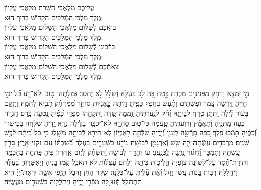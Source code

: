 \documentclass[twoside, openany, parskip=half, 11pt]{book}
\begin{document}
\birkashabonim

\medskip



עֲלֵיכֶם מַלְאֲכֵי הַשָּׁרֵת מַלְאֲכֵי עֶלְיוֹן\\ מֶֽלֶךְ מַלְכֵי הַמְּֿלָכִים הַקָּדוֹשׁ בָּרוּךְ הוּא: \\
בּוֹאֲכֶם לְֿשָׁלוֹם מַלְאֲכֵי הַשָּׁלוֹם מַלְאֲכֵי עֶלְיוֹן\\ מֶֽלֶךְ מַלְכֵי הַמְּֿלָכִים הַקָּדוֹשׁ בָּרוּךְ הוּא:\\
בָּרְֿכֽוּנִי לְֿשָׁלוֹם מַלְאֲכֵי הַשָּׁלוֹם מַלְאֲכֵי עֶלְיוֹן \\ מֶֽלֶךְ מַלְכֵי הַמְּֿלָכִים הַקָּדוֹשׁ בָּרוּךְ הוּא:\\
צֵאתְֿכֶם לְֿשָׁלוֹם מַלְאֲכֵי הַשָּׁלוֹם מַלְאֲכֵי עֶלְיוֹן\\ מֶֽלֶךְ מַלְכֵי הַמְּֿלָכִים הַקָּדוֹשׁ בָּרוּךְ הוּא:

\vfill
\clearpage


מִ֣י יִמְצָ֑א וְֿרָחֹ֖ק מִפְּֿנִינִ֣ים מִכְרָֽהּ׃ \hfill \break
בָּ֣טַח בָּ֭הּ לֵ֥ב בַּעְלָּ֑הּ וְֿ֝שָׁלָ֗ל לֹ֣א יֶחְסָר׃ \hfill \break
גְּֿמָלַ֣תְהוּ ט֣וֹב וְֿלֹא־רָ֑ע כֹּ֝֗ל יְֿמֵ֣י חַיֶּֽיהָ׃ \hfill \break
דָּֽ֭רְֿשָׁה צֶ֥מֶר וּפִשְׁתִּ֑ים וַ֝תַּ֗עַשׂ בְּֿחֵ֣פֶץ כַּפֶּֽיהָ׃ \hfill \break
הָֽ֭יְֿתָה כׇׇׇׇׇׇׇׇָּֽאֳנִיּ֣וֹת סוֹחֵ֑ר מִ֝מֶּרְחָ֗ק תָּ֘בִ֥יא לַחְמָֽהּ׃ \hfill \break
וַתָּ֤קָם בְּֿע֬וֹד לַ֗יְֿלָה וַתִּתֵּ֣ן טֶ֣רֶף לְֿבֵיתָ֑הּ וְֿ֝חֹ֗ק לְֿנַֽעֲרֹתֶֽיהָ׃ \hfill \break
זָֽמֲמָ֣ה שָׂ֭דֶה וַתִּקָּחֵ֑הוּ מִפְּֿרִ֥י כַ֝פֶּ֗יהָ נָ֣טְֿעָה כָּֽרֶם׃ \hfill \break
חָֽגְֿרָ֣ה בְֿע֣וֹז מָתְֿנֶ֑יהָ וַ֝תְּֿאַמֵּ֗ץ זְֿרוֹֽעֹתֶֽיהָ׃ \hfill \break
טָֽ֣֭עֲמָה כִּֽי־ט֣וֹב סַחְרָ֑הּ לֹֽא־יִכְבֶּ֖ה בַלַּ֣יְֿלָה נֵרָֽהּ׃ \hfill \break
יָ֭דֶיהָ שִׁלְּֿחָ֣ה בַכִּישׁ֑וֹר וְֿ֝כַפֶּ֗יהָ תָּ֣מְֿכוּ פָֽלֶךְ׃ \hfill \break
כַּ֭פָּהּ פָּֽרְֿשָׂ֣ה לֶֽעָנִ֑י וְֿ֝יָדֶ֗יהָ שִׁלְּֿחָ֥ה לָֽאֶבְיֽוֹן׃ \hfill \break
לֹֽא־תִירָ֣א לְֿבֵיתָ֣הּ מִשָּׁ֑לֶג כִּ֥י כׇל־בֵּ֝יתָ֗הּ לָ֘בֻ֥שׁ שָׁנִֽים׃ \hfill \break
מַרְבַדִּ֥ים עָֽשְֿׂתָה־לָּ֑הּ שֵׁ֖שׁ וְֿאַרְגָּמָ֣ן לְֿבוּשָֽׁהּ׃ \hfill \break
נוֹדָ֣ע בַּשְּֿׁעָרִ֣ים בַּעְלָּ֑הּ בְּֿ֝שִׁבְתּ֗וֹ עִם־זִקְנֵי־אָֽרֶץ׃ \hfill \break
סָדִ֣ין עָֽ֭שְֿׂתָה וַתִּמְכֹּ֑ר וַֽ֝חֲג֗וֹר נָֽתְֿנָ֥ה לַֽכְּֿנַֽעֲנִֽי׃ \hfill \break
עֹז וְֿהָדָ֣ר לְֿבוּשָׁ֑הּ וַ֝תִּשְׂחַ֗ק לְֿי֣וֹם אַֽחֲרֽוֹן׃ \hfill \break
פִּ֭יהָ פָּֽתְֿחָ֣ה בְֿחָכְֿמָ֑ה וְֿתֽוֹרַת־חֶ֝֗סֶד עַל־לְשׁוֹנָֽהּ׃ \hfill \break
צ֭וֹֽפִיָּה הֲֽלִיכ֣וֹת בֵּיתָ֑הּ וְֿלֶ֥חֶם עַ֝צְל֗וּת לֹ֣א תֹאכֵֽל׃ \hfill \break
קָ֣מוּ בָ֭נֶיהָ וַיְֿאַשְּֿׁר֑וּהָ בַּ֝עְלָּ֗הּ וַֽיְֿהַֽלֲלָֽהּ׃ \hfill \break
רַבּ֣וֹת בָּ֭נוֹת עָ֥שׂוּ חָ֑יִל וְֿ֝אַ֗תְּ עָ֘לִ֥יתְ עַל־כֻּלָּֽנָה׃ \hfill \break
שֶׁ֣קֶר הַ֭חֵן וְֿהֶ֣בֶל הַיֹּ֑פִי אִשָּׁ֥ה יִרְאַת־יְ֜יָ֗ הִ֣יא תִתְהַלָּֽל׃\hfill \break
תְּֽֿנוּ־לָ֭הּ מִפְּֿרִ֣י יָדֶ֑יהָ וִֽיהַֽלֲל֖וּהָ בַשְּֿׁעָרִ֣ים מַֽעֲשֶֽׂיהָ׃\hfill \break
\end{document}
